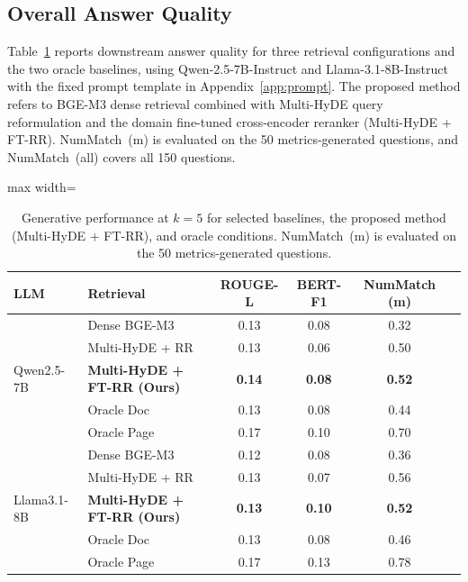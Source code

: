 \documentclass[12pt,twoside,maitrise]{dms}
\theoremstyle{definition}
\numberwithin{equation}{section}
\numberwithin{table}{chapter}
\numberwithin{figure}{chapter}
\begin{document}
\subsection{Overall Answer Quality}
\label{sec:gen_overall}

Table~\ref{tab:gen_overall} reports downstream answer quality for three retrieval
configurations and the two oracle baselines, using Qwen-2.5-7B-Instruct and
Llama-3.1-8B-Instruct with the fixed prompt template in Appendix~\ref{app:prompt}.
The proposed method refers to BGE-M3 dense retrieval combined with Multi-HyDE query
reformulation and the domain fine-tuned cross-encoder reranker (Multi-HyDE + FT-RR).
NumMatch~(m) is evaluated on the 50 metrics-generated questions, and NumMatch~(all) covers
all 150 questions.

\begin{table}[ht]
\centering
\small
\begin{adjustbox}{max width=\columnwidth}
\begin{tabular}{l l c c c c}
\toprule
\textbf{LLM} & \textbf{Retrieval} & \textbf{ROUGE-L} & \textbf{BERT-F1}
  & \textbf{NumMatch (m)} \\
\midrule
\multirow{5}{*}{Qwen2.5-7B}
& Dense BGE-M3                       & 0.13 & 0.08 & 0.32  \\
& Multi-HyDE + RR                    & 0.13 & 0.06 & 0.50  \\
& \textbf{Multi-HyDE + FT-RR (Ours)} & \textbf{0.14} & \textbf{0.08}
  & \textbf{0.52}  \\
& Oracle Doc                         & 0.13 & 0.08 & 0.44  \\
& Oracle Page                        & 0.17 & 0.10 & 0.70 \\
\midrule
\multirow{5}{*}{Llama3.1-8B}
& Dense BGE-M3                       & 0.12 & 0.08 & 0.36 \\
& Multi-HyDE + RR                    & 0.13 & 0.07 & 0.56 \\
& \textbf{Multi-HyDE + FT-RR (Ours)} & \textbf{0.13} & \textbf{0.10}
  & \textbf{0.52}  \\
& Oracle Doc                         & 0.13 & 0.08 & 0.46 \\
& Oracle Page                        & 0.17 & 0.13 & 0.78  \\
\bottomrule
\end{tabular}
\end{adjustbox}
\caption{Generative performance at $k=5$ for selected baselines, the proposed method
  (Multi-HyDE + FT-RR), and oracle conditions. NumMatch~(m) is evaluated on the 50
  metrics-generated questions.}
\label{tab:gen_overall}
\end{table}
\end{document}

